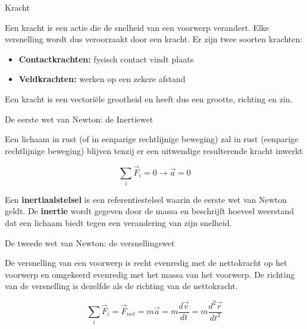 \begin{theo}[Kracht]{Kracht}

Een kracht is een actie die de snelheid van een voorwerp verandert. Elke versnelling wordt dus veroorzaakt door een kracht. Er zijn twee soorten krachten: 

\begin{itemize}
    \item \textbf{Contactkrachten:} fysisch contact vindt plaats
    \item \textbf{Veldkrachten:} werken op een zekere afstand
\end{itemize}

\hspace{-0.65cm} Een kracht is een vectoriële grootheid en heeft dus een grootte, richting en zin.

\end{theo}

\begin{lem}{De eerste wet van Newton: de Inertiewet}

Een lichaam in rust (of in eenparige rechtlijnige beweging) zal in rust (eenparige rechtlijnige beweging) blijven tenzij er een uitwendige resulterende kracht inwerkt

    \begin{equation*}
        \sum_{i} \Vec{F}_i = 0 \to \Vec{a} = 0
    \end{equation*}

\hspace{-0.65cm} Een \textbf{inertiaalstelsel} is een referentiestelsel waarin de eerste wet van Newton geldt. De \textbf{inertie} wordt gegeven door de massa en beschrijft hoeveel weerstand dat een lichaam biedt tegen een verandering van zijn snelheid. 


\end{lem}

\begin{lem}{De tweede wet van Newton: de versnellingswet}

De versnelling van een voorwerp is recht evenredig met de nettokracht op het voorwerp en omgekeerd evenredig met het massa van het voorwerp. De richting van de versnelling is dezelfde als de richting van de nettokracht.

    \begin{equation*}
        \sum_{i} \Vec{F}_i = \Vec{F}_{net} = m\Vec{a} = m\dfrac{d\Vec{v}}{dt} = m\dfrac{d^2\Vec{r}}{dt^2}
    \end{equation*}

\end{lem}

